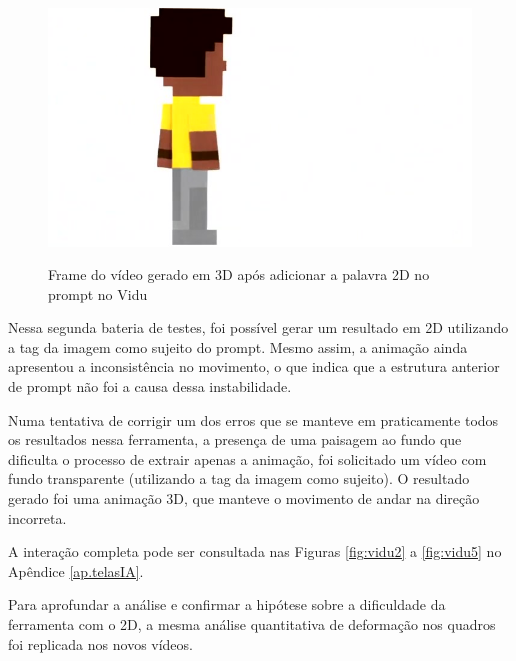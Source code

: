 \begin{figure}[htbp]
\begin{minipage}{0.45\textwidth}
    \label{fig:viduSair}
    \end{minipage}\hfill
\end{figure}

\begin{figure}[htbp]
    \centering
    \caption{\small Frame do vídeo gerado em 3D após adicionar a palavra 2D no prompt no Vidu}
    \includegraphics[width=0.5\linewidth]{figs/vidu/frame5_3D.jpg}
    \label{fig:vidu2D3D}
\end{figure}\hfill

Nessa segunda bateria de testes, foi possível gerar um resultado em 2D utilizando a tag da imagem como sujeito do prompt. Mesmo assim, a animação ainda apresentou a inconsistência no movimento, o que indica que a estrutura anterior de prompt não foi a causa dessa instabilidade.

Numa tentativa de corrigir um dos erros que se manteve em praticamente todos os resultados nessa ferramenta, a presença de uma paisagem ao fundo que dificulta o processo de extrair apenas a animação, foi solicitado um vídeo com fundo transparente (utilizando a tag da imagem como sujeito). O resultado gerado foi uma animação 3D, que manteve o movimento de andar na direção incorreta.

A interação completa pode ser consultada nas Figuras \ref{fig:vidu2} a \ref{fig:vidu5} no Apêndice \ref{ap.telasIA}.

Para aprofundar a análise e confirmar a hipótese sobre a dificuldade da ferramenta com o 2D, a mesma análise quantitativa de deformação nos quadros foi replicada nos novos vídeos. 

